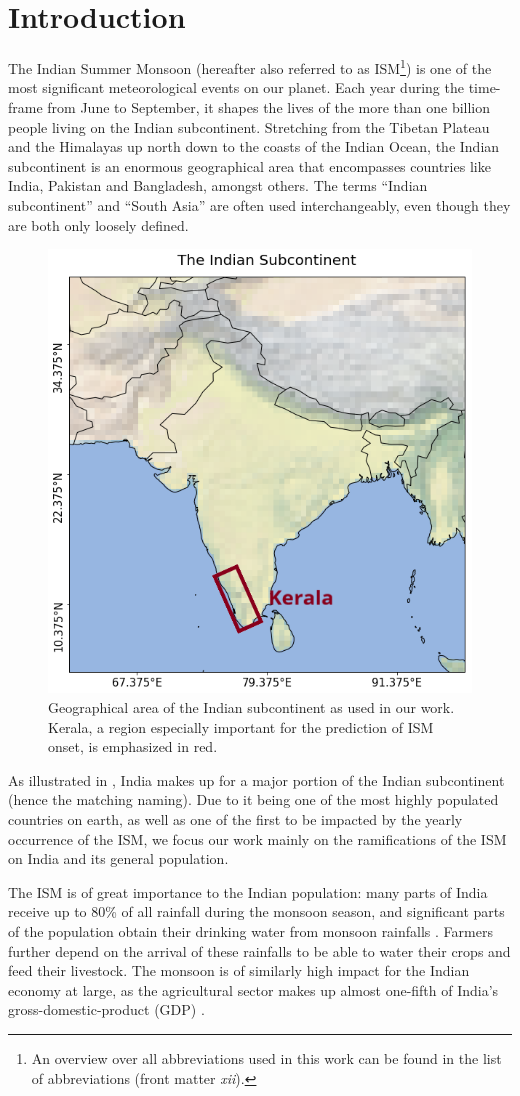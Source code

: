 \chapter{Introduction}
\label{c:introduction}

The Indian Summer Monsoon (hereafter also referred to as ISM\footnote{An overview over all abbreviations used in this work can be found in the list of abbreviations (front matter \textit{xii}).}) is one of the most significant meteorological events on our planet. Each year during the time-frame from June to September, it shapes the lives of the more than one billion people living on the Indian subcontinent. Stretching from the Tibetan Plateau and the Himalayas up north down to the coasts of the Indian Ocean, the Indian subcontinent is an enormous geographical area that encompasses countries like India, Pakistan and Bangladesh, amongst others. The terms ``Indian subcontinent'' and ``South Asia'' are often used interchangeably, even though they are both only loosely defined.

\begin{figure}[h]
  \centering
  \includegraphics[width=0.3\linewidth]{./99_appendix/img/area_overview_kerala}
  \caption{Geographical area of the Indian subcontinent as used in our work. Kerala, a region especially important for the prediction of ISM onset, is emphasized in red.}
  \label{fig:the_indian_subcontinent}
\end{figure}

As illustrated in , India makes up for a major portion of the Indian subcontinent (hence the matching naming). Due to it being one of the most highly populated countries on earth, as well as one of the first to be impacted by the yearly occurrence of the ISM, we focus our work mainly on the ramifications of the ISM on India and its general population.

The ISM is of great importance to the Indian population: many parts of India receive up to 80\% of all rainfall during the monsoon season, and significant parts of the population obtain their drinking water from monsoon rainfalls \citep{Stolbova.2015}. Farmers further depend on the arrival of these rainfalls to be able to water their crops and feed their livestock. The monsoon is of similarly high impact for the Indian economy at large, as the agricultural sector makes up almost one-fifth of India's gross-domestic-product (GDP) \citep{CentralIntelligenceAgency.05.01.2018}.

